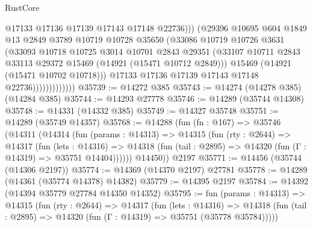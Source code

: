 \begin{lexlean}{RustCore}
\begin{coremodule}
                                @17133
                                @17136
                                @17139
                                @17143
                                @17148
                                @22736)))
                          (@29396
                            @10695
                            @604
                            @1849
                            @13
                            @2849
                            @3789
                            @10719
                            @10728
                            @35650
                            (@33086
                              @10719
                              @10726
                              @3631
                              (@33093
                                @10718
                                @10725
                                @3014
                                @10701
                                @2843
                                @29351
                                (@33107
                                  @10711
                                  @2843
                                  @33113
                                  @29372
                                  @15469
                                  (@14921 (@15471 @10712 @2849)))
                                @15469
                                (@14921 (@15471 @10702 @10718)))
                              @17133
                              @17136
                              @17139
                              @17143
                              @17148
                              @22736)))))))))))))
@35739 := @14272 @385
@35743 := @14274 (@14278 @385) (@14284 @385)
@35744 := @14293 @27778
@35746 := @14289 (@35744 @14308)
@35748 := @14331 (@14332 @385)
@35749 := @14327 @35748
@35751 := @14289 (@35749 @14357)
@35768 := @14288
    (fun (fn : @167) =>
    @35746
      (@14311
        (@14314
          (fun (params : @14313) =>
          @14315
            (fun (rty : @2644) =>
            @14317
              (fun (lets : @14316) =>
              @14318 (fun (tail : @2895) => @14320 (fun (Γ : @14319) => @35751 @14404))))))
        @14450))
    @2197
@35771 := @14456 (@35744 (@14306 @2197))
@35774 := @14369 (@14370 @2197) @27781
@35778 := @14289 (@14361 (@35774 @14378) @14382)
@35779 := @14395 @2197
@35784 := @14392 (@14394 @35779 @27784 @14350 @14352)
@35795 := fun (params : @14313) =>
  @14315
    (fun (rty : @2644) =>
    @14317
      (fun (lets : @14316) =>
      @14318 (fun (tail : @2895) => @14320 (fun (Γ : @14319) => @35751 (@35778 @35784)))))

\end{coremodule}
\end{lexlean}
